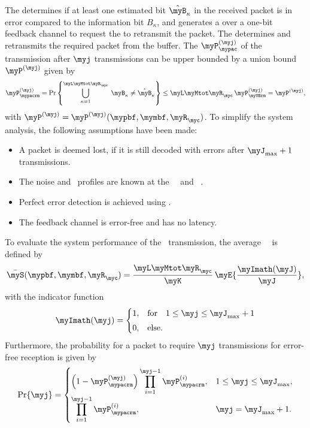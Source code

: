 \begin{minipage}[t][12cm]{\columnwidth}
The \mySU{} \myRX{} determines if at least one estimated bit $\hat \myB_{\kappa}$ in the received packet is in error compared to the information bit
$B_{\kappa}$, and generates a \myTHARQ{} over a one-bit feedback channel
to request the \mySU{} \myTX{} to retransmit the packet. The \mySU{} \myTX{}
\myTHARQ{} determines and retransmits the required packet from
the \myTX{} buffer. The \myPEP{} $\myP^{(\myj)}_{\mypac}$ of the \mySU{} transmission after $\myj$ transmissions can be upper bounded by a union bound $\myP^{(\myj)}$ given by
\[
\myP^{(\myj)}_{\mypacrm}
= 
\Pr\left\{
    \bigcup_{\kappa = 1}^{\myL \myMtot\myR_{\myc}}
    \; \myB_{\kappa} \ne \hat{\myB}_{\kappa}
\right\}
\le
\myL \myMtot \myR_{\myc} \, \myP^{(\myj)}_{\myUBrm}
= 
\myP^{(\myj)} ,
\]
with 
$\myP^{(\myj)} = \myP^{(\myj)}(\mypbf, \mymbf, \myR_{\myc})$.
To simplify the system analysis,
the following assumptions have been made:
\begin{itemize}[leftmargin=1.9em]
    \renewcommand\labelitemi{$\scriptstyle\bullet$}
    \item A packet is deemed lost, if it is still decoded with errors after $\myJ_{\max}+1$ transmissions.
    \item The noise and \myTPI\ profiles are known at the \mySU\ \myRX\ and \myPU\ \myRX{}.
    \item Perfect error detection is achieved using \myCRC{}.
    \item The feedback channel is error-free and has no latency.
\end{itemize}
To evaluate the system performance of the \mySU\ transmission,
the average \mySU\ \mySE\ is defined by
\begin{equation}
\bar{\myS}(\mypbf,\mymbf,\myR_\myc)
  = \frac{\myL \myMtot \myR_\myc}{\myK}
    \, \myE{\frac{\myImath(\myJ)}{\myJ}},
\label{eq:6}
\end{equation}
with the indicator function
\[
\myImath(\myj) =
\begin{cases}
  1, & \text{for\quad} 1 \le \myj \le \myJ_{\max}+1 \\[0.3em]
  0, & \text{else}.
\end{cases}
\]
Furthermore, the probability for a packet to require $\myj$ transmissions for error-free reception is given by
\begin{equation}
\Pr\{\myj\} =
\begin{cases}
\displaystyle \Bigl( 1 - \myP_{\mypacrm}^{(\myj)} \Bigr) 
\prod_{i=1}^{\myj-1} \myP_{\mypacrm}^{(i)}, 
& 1 \le \myj \le \myJ_{\max}, \\[1em]
\displaystyle \prod_{i=1}^{\myj-1} \myP_{\mypacrm}^{(i)}, 
& \myj = \myJ_{\max}+1.
\end{cases}
\label{eq:7}
\end{equation}


\end{minipage}

